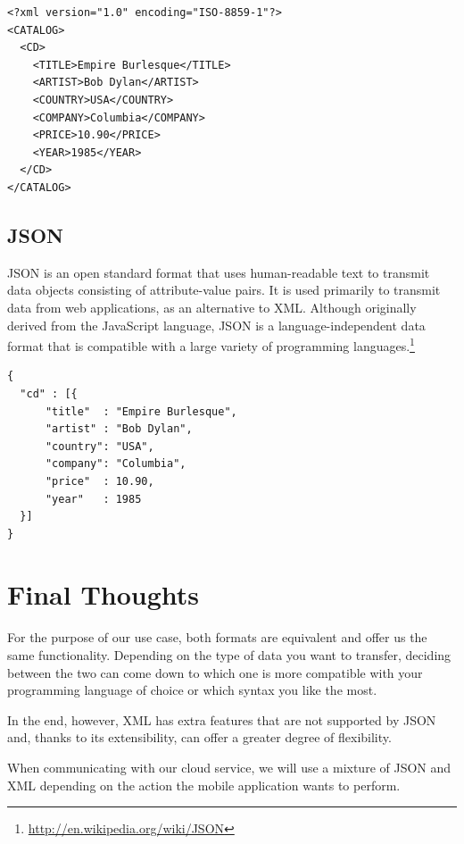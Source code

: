 \lstset{language=XML}
\begin{lstlisting}[frame=lt,caption=An XML example]
<?xml version="1.0" encoding="ISO-8859-1"?>
<CATALOG>
  <CD>
    <TITLE>Empire Burlesque</TITLE>
    <ARTIST>Bob Dylan</ARTIST>
    <COUNTRY>USA</COUNTRY>
    <COMPANY>Columbia</COMPANY>
    <PRICE>10.90</PRICE>
    <YEAR>1985</YEAR>
  </CD>
</CATALOG>

\end{lstlisting}

\subsection{JSON}

\ac{JSON} is an open standard format that uses human-readable text to transmit data objects consisting of attribute-value pairs. It is used primarily to transmit data from web applications, as an alternative to XML. Although originally derived from the JavaScript language, JSON is a language-independent data format that is compatible with a large variety of programming languages.\footnote{\url{http://en.wikipedia.org/wiki/JSON}}

\begin{lstlisting}[frame=lt,caption=A JSON example]
{ 
  "cd" : [{
      "title"  : "Empire Burlesque",
      "artist" : "Bob Dylan",
      "country": "USA",
      "company": "Columbia",
      "price"  : 10.90,
      "year"   : 1985
  }]
}
\end{lstlisting}

\section{Final Thoughts}

For the purpose of our use case, both formats are equivalent and offer us the same functionality. Depending on the type of data you want to transfer, deciding between the two can come down to which one is more compatible with your programming language of choice or which syntax you like the most. 

In the end, however, \ac{XML} has extra features that are not supported by \ac{JSON} and, thanks to its extensibility, can offer a greater degree of flexibility.

When communicating with our cloud service, we will use a mixture of \ac{JSON} and \ac{XML} depending on the action the mobile application wants to perform. 



   
  




 
  
